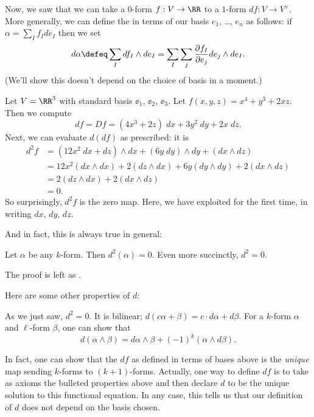 Now, we saw that we can take a $0$-form $f : V \to \RR$ to a $1$-form $df : V \to V^\vee$.
More generally, we can define the  in terms of our basis $e_1$, \dots, $e_n$ as follows:
if $\alpha = \sum_I f_I de_I$ then we set
\[ d\alpha \defeq \sum_I df_I \wedge de_I = \sum_I \sum_j \fpartial{f_I}{e_j} de_j \wedge de_I. \]
(We'll show this doesn't depend on the choice of basis in a moment.)
\begin{example}
	Let $V = \RR^3$ with standard basis $\ee_1$, $\ee_2$, $\ee_3$.
	Let $f(x,y,z) = x^4 + y^3 + 2xz$.
	Then we compute
	\[ df = Df = (4x^3+2z) \; dx + 3y^2 \; dy + 2x \; dz. \]
	Next, we can evaluate $d(df)$ as prescribed: it is
	\begin{align*}
		d^2f &= (12x^2 \; dx + dz) \wedge dx + (6y \; dy) \wedge dy + (dx \wedge dz) \\
		&= 12x^2 (dx \wedge dx) + 2(dz \wedge dx) + 6y (dy \wedge dy) + 2(dx \wedge dz) \\
		&= 2(dz \wedge dx) + 2(dx \wedge dz) \\
		&= 0.
	\end{align*}
	So surprisingly, $d^2f$ is the zero map.
	Here, we have exploited  for the first time,
	in writing $dx$, $dy$, $dz$.
\end{example}
And in fact, this is always true in general:
\begin{theorem}
	Let $\alpha$ be any $k$-form.
	Then $d^2(\alpha) = 0$.
	Even more succinctly, $d^2 = 0$.
	\label{thm:dd_zero}
\end{theorem}
The proof is left as .

Here are some other properties of $d$:
\begin{itemize}
	\ii As we just saw, $d^2 = 0$.
	\ii It is bilinear; $d(c\alpha+\beta) = c \cdot d\alpha + d\beta$.
	\ii For a $k$-form $\alpha$ and $\ell$-form $\beta$, one can show that
	\[ d(\alpha \wedge \beta) = d\alpha \wedge \beta + (-1)^k (\alpha \wedge d\beta). \]
\end{itemize}
In fact, one can show that the $df$ as defined in terms of bases above is
the \emph{unique} map sending $k$-forms to $(k+1)$-forms.
Actually, one way to define $df$ is to take as axioms the bulleted properties above
and then declare $d$ to be the unique solution to this functional equation.
In any case, this tells us that our definition of $d$ does not depend on the basis chosen.

